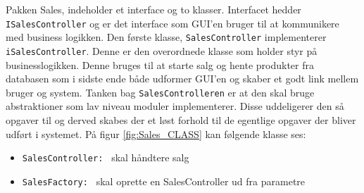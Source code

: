 Pakken Sales, indeholder et interface og to klasser. Interfacet hedder \texttt{ISalesController} og er det interface som GUI'en bruger til at kommunikere med business logikken.
Den første klasse, \texttt{SalesController} implementerer \texttt{iSalesController}. Denne er den overordnede klasse som holder styr på businesslogikken. Denne bruges til at starte salg og hente produkter fra databasen som i sidste ende både udformer GUI'en og skaber et godt link mellem bruger og system. Tanken bag \texttt{SalesControlleren} er at den skal bruge abstraktioner som lav niveau moduler implementerer. Disse uddeligerer den så opgaver til og derved skabes der et løst forhold til de egentlige opgaver der bliver udført i systemet. På figur \ref{fig:Sales_CLASS} kan følgende klasse ses:

\begin{itemize}
	\item \texttt{SalesController: } skal håndtere salg
	\item \texttt{SalesFactory: } skal oprette en SalesController ud fra parametre
\end{itemize}

